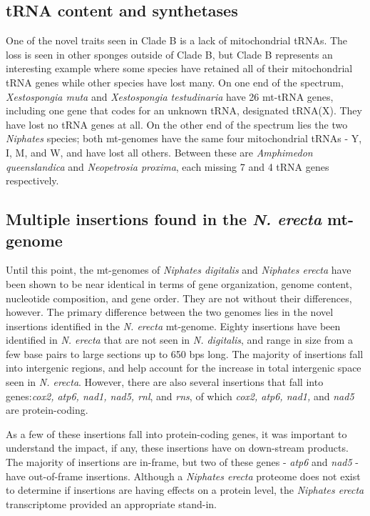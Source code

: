 \documentclass[../main.tex]{subfiles}
\begin{document}
\subsection{tRNA content and synthetases}
One of the novel traits seen in Clade B is a lack of mitochondrial tRNAs. The loss is seen in other sponges outside of Clade B, but Clade B represents an interesting example where some species have retained all of their mitochondrial tRNA genes while other species have lost many. On one end of the spectrum, \emph{Xestospongia muta} and \emph{Xestospongia testudinaria} have 26 mt-tRNA genes, including one gene that codes for an unknown tRNA, designated tRNA(X). They have lost no tRNA genes at all. On the other end of the spectrum lies the two \emph{Niphates} species; both mt-genomes have the same four mitochondrial tRNAs - Y, I, M, and W, and have lost all others. Between these are \emph{Amphimedon queenslandica} and \emph{Neopetrosia proxima}, each missing 7 and 4 tRNA genes respectively.

\subsection{Multiple insertions found in the \emph{N. erecta} mt-genome}

Until this point, the mt-genomes of \emph{Niphates digitalis} and \emph{Niphates erecta} have been shown to be near identical in terms of gene organization, genome content, nucleotide composition, and gene order. They are not without their differences, however. The primary difference between the two genomes lies in the novel insertions identified in the \emph{N. erecta} mt-genome. Eighty insertions have been identified in \emph{N. erecta} that are not seen in \emph{N. digitalis}, and range in size from a few base pairs to large sections up to 650 bps long. The majority of insertions fall into intergenic regions, and help account for the increase in total intergenic space seen in \emph{N. erecta}. However, there are also several insertions that fall into genes:\emph{cox2, atp6, nad1, nad5, rnl}, and \emph{rns}, of which \emph{cox2, atp6, nad1,} and \emph{nad5} are protein-coding.

As a few of these insertions fall into protein-coding genes, it was important to understand the impact, if any, these insertions have on down-stream products. The majority of insertions are in-frame, but two of these genes - \emph{atp6} and \emph{nad5} - have out-of-frame insertions. Although a \emph{Niphates erecta} proteome does not exist to determine if insertions are having effects on a protein level, the \emph{Niphates erecta} transcriptome provided an appropriate stand-in.
\end{document}
